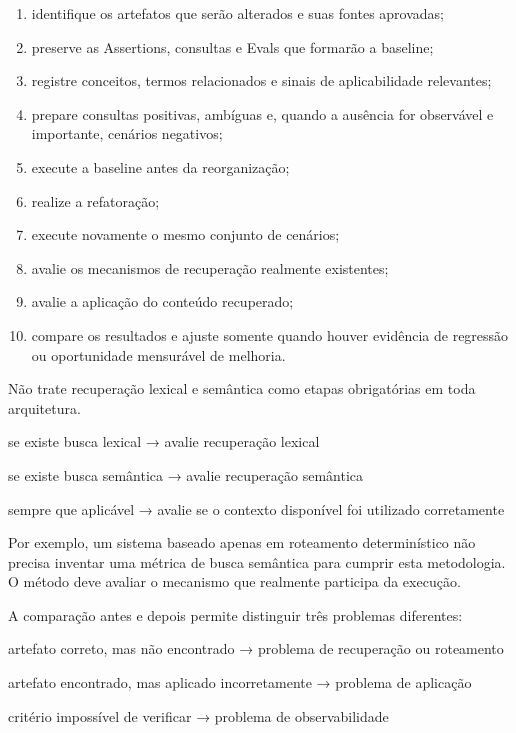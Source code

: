 \documentclass[
  10pt,
  a4paper,
  oneside]{book}
\newenvironment{Shaded}{}{}
\newcommand{\NormalTok}[1]{#1}
\providecommand{\tightlist}{%
  \setlength{\itemsep}{0pt}\setlength{\parskip}{0pt}}
\renewenvironment{Shaded}{\begin{snugshade}}{\end{snugshade}}%
\begin{document}
\begin{enumerate}
\def\labelenumi{\arabic{enumi}.}
\tightlist
\item
  identifique os artefatos que serão alterados e suas fontes aprovadas;
\item
  preserve as Assertions, consultas e Evals que formarão a baseline;
\item
  registre conceitos, termos relacionados e sinais de aplicabilidade
  relevantes;
\item
  prepare consultas positivas, ambíguas e, quando a ausência for
  observável e importante, cenários negativos;
\item
  execute a baseline antes da reorganização;
\item
  realize a refatoração;
\item
  execute novamente o mesmo conjunto de cenários;
\item
  avalie os mecanismos de recuperação realmente existentes;
\item
  avalie a aplicação do conteúdo recuperado;
\item
  compare os resultados e ajuste somente quando houver evidência de
  regressão ou oportunidade mensurável de melhoria.
\end{enumerate}

Não trate recuperação lexical e semântica como etapas obrigatórias em
toda arquitetura.

\begin{Shaded}
\begin{Highlighting}[]
\NormalTok{se existe busca lexical}
\NormalTok{→ avalie recuperação lexical}

\NormalTok{se existe busca semântica}
\NormalTok{→ avalie recuperação semântica}

\NormalTok{sempre que aplicável}
\NormalTok{→ avalie se o contexto disponível foi utilizado corretamente}
\end{Highlighting}
\end{Shaded}

Por exemplo, um sistema baseado apenas em roteamento determinístico não
precisa inventar uma métrica de busca semântica para cumprir esta
metodologia. O método deve avaliar o mecanismo que realmente participa
da execução.

A comparação antes e depois permite distinguir três problemas
diferentes:

\begin{Shaded}
\begin{Highlighting}[]
\NormalTok{artefato correto, mas não encontrado}
\NormalTok{→ problema de recuperação ou roteamento}

\NormalTok{artefato encontrado, mas aplicado incorretamente}
\NormalTok{→ problema de aplicação}

\NormalTok{critério impossível de verificar}
\NormalTok{→ problema de observabilidade}
\end{Highlighting}
\end{Shaded}
\end{document}
